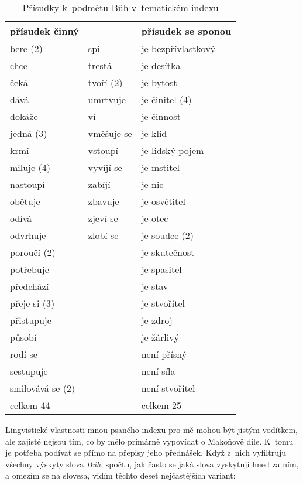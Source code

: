 \begin{table}[htpb]
\begin{center}
\begin{tabular}{|l l|l|}
\hline
přísudek činný & & přísudek se sponou \\
\hline
bere (2\texttimes{})	& spí	& je bezpřívlastkový	\\
chce	& trestá	& je desítka	\\
čeká	& tvoří (2\texttimes{})	& je bytost	\\
dává	& umrtvuje	& je činitel (4\texttimes{})	\\
dokáže	& ví	& je činnost	\\
jedná (3\texttimes{})	& vměšuje se	& je klid	\\
krmí	& vstoupí	& je lidský pojem	\\
miluje (4\texttimes{})	& vyvíjí se	& je mstitel	\\
nastoupí	& zabíjí	& je nic	\\
obětuje 	& zbavuje	& je osvětitel	\\
odívá 	& zjeví se	& je otec	\\
odvrhuje 	& zlobí se	& je soudce (2\texttimes{})	\\
poroučí (2\texttimes{})	&	& je skutečnost	\\
potřebuje 	&	& je spasitel	\\
předchází 	&	& je stav	\\
přeje si (3\texttimes{})	&	& je stvořitel	\\
přistupuje 	&	& je zdroj	\\
působí 	&	& je žárlivý	\\
rodí se 	&	& není přísný	\\
sestupuje 	&	& není síla	\\
smilovává se (2\texttimes{})	&	& není stvořitel	\\
\hline
celkem 44	&	& celkem 25	\\
\hline
\end{tabular}
\caption{Přísudky k~podmětu Bůh v~tematickém indexu}
\label{tab:topicidx-god-verbs}
\end{center}
\end{table}

Lingvistické vlastnosti mnou psaného indexu pro mě mohou být jistým vodítkem,
ale zajisté nejsou tím, co by mělo primárně vypovídat o Makoňově díle. K~tomu je
potřeba podívat se přímo na přepisy jeho přednášek. Když z~nich vyfiltruju
všechny výskyty slova \textit{Bůh}, spočtu, jak často se jaká slova vyskytují
hned za ním, a omezím se na slovesa, vidím těchto deset nejčastějších variant:

